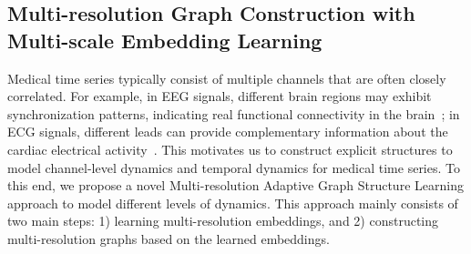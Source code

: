 
\vspace{-2mm}
\subsection{Multi-resolution Graph Construction with Multi-scale Embedding Learning}\label{sec:1}

Medical time series typically consist of multiple channels that are often closely correlated. For example, in EEG signals, different brain regions may exhibit synchronization patterns, indicating real functional connectivity in the brain~\cite{teplan2002fundamentals}; in ECG signals, different leads can provide complementary information about the cardiac electrical activity~\cite{berkaya2018survey}. This motivates us to construct explicit structures to model channel-level dynamics and temporal dynamics for medical time series. To this end, we propose a novel Multi-resolution Adaptive Graph Structure Learning approach to model different levels of dynamics. This approach mainly consists of two main steps: 1) learning multi-resolution embeddings, and 2) constructing multi-resolution graphs based on the learned embeddings. 
